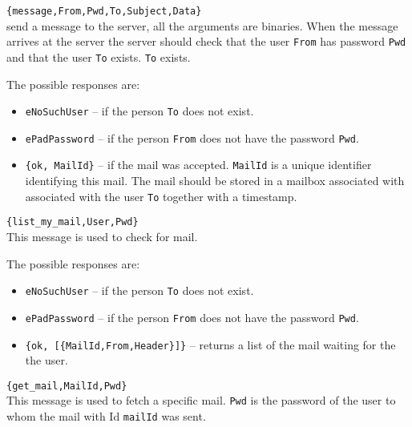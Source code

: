 \documentclass[12pt]{hitec}
\begin{document}
\begin{description}

\item \verb+{message,From,Pwd,To,Subject,Data}+\\
  send a message to
  the server, all the arguments are binaries. When the message arrives
  at the server the server should check that the user \verb+From+ has
  password \verb+Pwd+ and that the user \verb+To+ exists.  \verb+To+
  exists.

  The possible responses are:
  
  \begin{itemize}
  
  \item \verb+eNoSuchUser+ -- if the person \verb+To+ does not exist.
  
  \item \verb+ePadPassword+  -- if the person \verb+From+ does not have the
  password \verb+Pwd+.
  
\item \verb+{ok, MailId}+ -- if the mail was accepted. \verb+MailId+ is
  a unique identifier identifying this mail.
  The mail should be stored in a mailbox associated with 
  associated with the user \verb+To+ together with a timestamp.
 

 \end{itemize}
  
 
\item \verb+{list_my_mail,User,Pwd}+\\
  This message is used to check for mail. 

  The possible responses are:
  
  \begin{itemize}
  
  \item \verb+eNoSuchUser+ -- if the person \verb+To+ does not exist.
  
  \item \verb+ePadPassword+  -- if the person \verb+From+ does not have the
  password \verb+Pwd+.
  
\item \verb+{ok, [{MailId,From,Header}]}+ -- returns a list of the mail
  waiting for the the user.
  \end{itemize}

 
\item \verb+{get_mail,MailId,Pwd}+\\
  This message is used to fetch a specific mail. \verb+Pwd+ is  
  the password of the user to whom the mail with Id \verb+mailId+ was sent.


\end{description}
\end{document}
